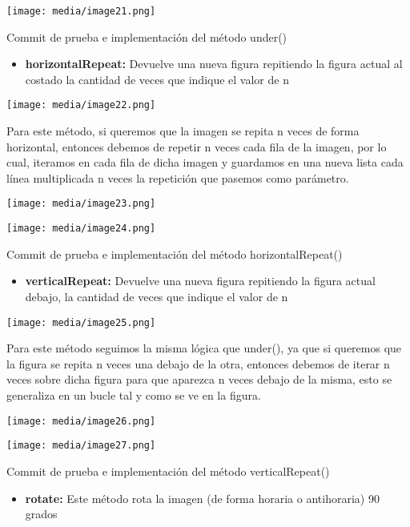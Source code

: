 \documentclass[
]{article}
\begin{document}
\texttt{[image: media/image21.png]}

Commit de prueba e implementación del método under()

\begin{itemize}
\item
  \textbf{horizontalRepeat:} Devuelve una nueva figura repitiendo la
  figura actual al costado la cantidad de veces que indique el valor de
  n
\end{itemize}

\texttt{[image: media/image22.png]}

Para este método, si queremos que la imagen se repita n veces de forma
horizontal, entonces debemos de repetir n veces cada fila de la imagen,
por lo cual, iteramos en cada fila de dicha imagen y guardamos en una
nueva lista cada línea multiplicada n veces la repetición que pasemos
como parámetro.

\texttt{[image: media/image23.png]}

\texttt{[image: media/image24.png]}

Commit de prueba e implementación del método horizontalRepeat()

\begin{itemize}
\item
  \textbf{verticalRepeat:} Devuelve una nueva figura repitiendo la
  figura actual debajo, la cantidad de veces que indique el valor de n
\end{itemize}

\texttt{[image: media/image25.png]}

Para este método seguimos la misma lógica que under(), ya que si
queremos que la figura se repita n veces una debajo de la otra, entonces
debemos de iterar n veces sobre dicha figura para que aparezca n veces
debajo de la misma, esto se generaliza en un bucle tal y como se ve en
la figura.

\texttt{[image: media/image26.png]}

\texttt{[image: media/image27.png]}

Commit de prueba e implementación del método verticalRepeat()

\begin{itemize}
\item
  \textbf{rotate:} Este método rota la imagen (de forma horaria o
  antihoraria) 90 grados
\end{itemize}
\end{document}
